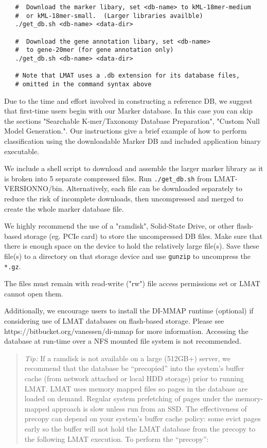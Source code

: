 \documentclass[11pt]{article}
\newcommand{\lmatver}{VERSIONNO}
\begin{document}
\begin{enumerate}[A.]
{\begin{verbatim}
   #  Download the marker libary, set <db-name> to kML-18mer-medium
   #  or kML-18mer-small.  (Larger libraries availble)
   ./get_db.sh <db-name> <data-dir>

   #  Download the gene annotation libary, set <db-name> 
   #  to gene-20mer (for gene annotation only)
   ./get_db.sh <db-name> <data-dir>

   # Note that LMAT uses a .db extension for its database files,
   # omitted in the command syntax above

\end{verbatim}     
         
     Due to the time and effort involved in constructing a reference
     DB, we suggest that first-time users begin with our Marker
     database.  In this case you can skip the sections "Searchable
     K-mer/Taxonomy Database Preparation", "Custom Null Model
     Generation.".  Our  instructions give a
     brief example of how to perform classification using the
     downloadable Marker DB and included application binary
     executable.

     We include a shell script to download and assemble the larger
     marker library as it is broken into 5 separate compressed files.
     Run \texttt{./get\_db.sh} from LMAT-\lmatver/bin.
     Alternatively, each file can be downloaded separately to reduce
     the risk of incomplete downloads, then uncompressed and merged to
     create the whole marker database file.
        
     We highly recommend the use of a "ramdisk", Solid-State Drive, or
     other flash-based storage (eg. PCIe card) to store the
     uncompressed DB files.  Make sure that there is enough space on
     the device to hold the relatively large file(s).  Save these
     file(s) to a directory on that storage device and use
     \texttt{gunzip} to uncompress the \texttt{*.gz}.

     The files must remain with read-write ("rw") file access
     permissions set or LMAT cannot open them.

     Additionally, we encourage users to install
     the DI-MMAP runtime (optional) if considering use of LMAT
     databases on flash-based storage.  Please see
     https://bitbucket.org/vanessen/di-mmap for more information.
     Accessing the database at run-time over a NFS mounted file system
     is not recommended.  

\begin{quote}
  {\it Tip:} If a ramdisk is not available on a large (512GB+) server,
  we recommend that the database be ``precopied'' into the system's
  buffer cache (from network attached or local HDD storage) prior to
  running LMAT.  LMAT uses memory mapped files so pages in the
  database are loaded on demand.  Regular system prefetching of pages
  under the memory-mapped approach is slow unless run from an SSD.
  The effectiveness of precopy can depend on your system's buffer
  cache policy: some evict pages early so the buffer will not hold the
  LMAT database from the precopy to the following LMAT execution.  To
  perform the ``precopy'':


\end{quote}}
\end{enumerate}
\end{document}
